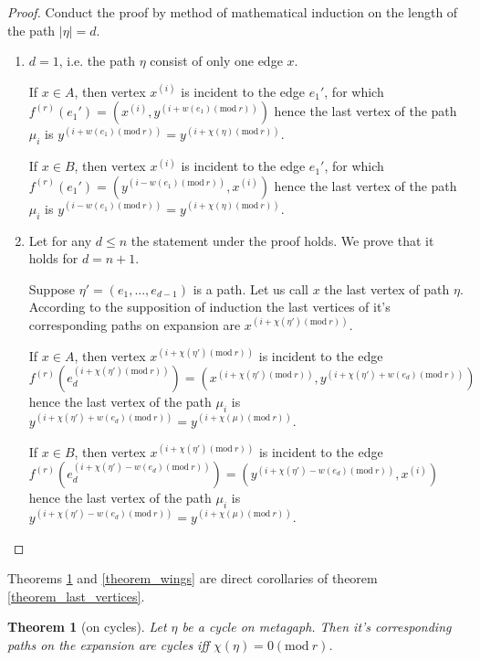 \documentclass[leqno]{aadmbook}
\newtheorem{theorem}{Theorem}
\renewcommand{\mod}[1]{\textrm{mod}\ #1}
\begin{document}
\begin{proof}
    Conduct the proof by method of mathematical induction on the length of the path $|\eta| = d$.
    
    \begin{enumerate}
    \item $d = 1$, i.e. the path $\eta$ consist of only one edge $x$.
    
    If $x \in A$, then vertex $x^{(i)}$ is incident to the edge $e_1'$, for which $f^{(r)}(e_1') = (x^{(i)}, y^{(i + w(e_1) (\mod{r}))})$ hence the last vertex of the path $\mu_i$ is $y^{(i + w(e_1) (\mod{r}))} = y^{(i + \chi(\eta) (\mod{r}))}$.
    
    If $x \in B$, then vertex $x^{(i)}$ is incident to the edge $e_1'$, for which $f^{(r)}(e_1') = (y^{(i - w(e_1) (\mod{r}))}, x^{(i)})$ hence the last vertex of the path $\mu_i$ is $y^{(i - w(e_1) (\mod{r}))} = y^{(i + \chi(\eta) (\mod{r}))}$.
    
    \item Let for any $d \leq n$ the statement under the proof holds. We prove that it holds for $d = n + 1$.

    Suppose $\eta' = (e_1, ..., e_{d - 1})$ is a path. Let us call $x$ the last vertex of path $\eta$. According to the supposition of induction the last vertices of it's corresponding paths on expansion are $x^{(i + \chi(\eta')(\mod{r}))}$.
    
    If $x \in A$, then vertex $x^{(i + \chi(\eta')(\mod{r}))}$ is incident to the edge $f^{(r)}(e_d^{(i + \chi(\eta')(\mod{r}))}) = (x^{(i + \chi(\eta')(\mod{r}))}, y^{(i + \chi(\eta') + w(e_d) (\mod{r}))})$ hence the last vertex of the path $\mu_i$ is $y^{(i + \chi(\eta') + w(e_d) (\mod{r}))} = y^{(i + \chi(\mu) (\mod{r}))}$.
    
    If $x \in B$, then vertex $x^{(i + \chi(\eta')(\mod{r}))}$ is incident to the edge $f^{(r)}(e_d^{(i + \chi(\eta') - w(e_d) (\mod{r}))}) = (y^{(i + \chi(\eta') - w(e_d) (\mod{r}))}, x^{(i)})$ hence the last vertex of the path $\mu_i$ is $y^{(i + \chi(\eta') - w(e_d) (\mod{r}))} = y^{(i + \chi(\mu) (\mod{r}))}$.  
    
    \end{enumerate}  
\end{proof}

Theorems \ref{theorem_cycles} and \ref{theorem_wings} are direct corollaries of theorem \ref{theorem_last_vertices}.

\begin{theorem}[on cycles]\label{theorem_cycles}
    Let $\eta$ be a cycle on metagaph. Then it's corresponding paths on the expansion are cycles iff $\chi(\eta) = 0 (\mod{r})$.
\end{theorem}
\end{document}
